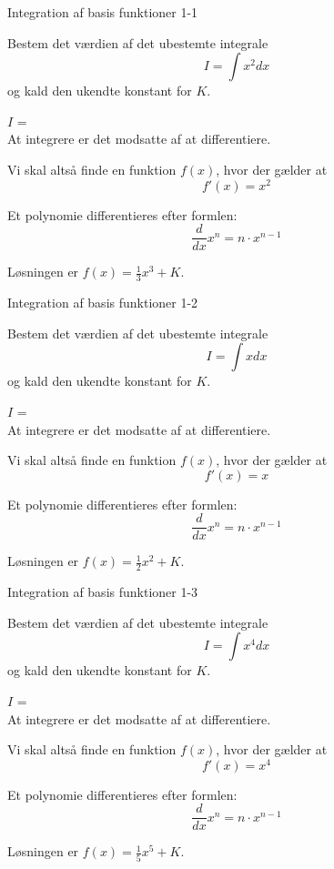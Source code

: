 \documentclass{article}
\begin{document}
\tableofcontents

\begin{exercise}{Integration af basis funktioner 1-1}

Bestem det værdien af det ubestemte integrale
\[
I = \int x^2 dx
\]
og kald den ukendte konstant for $K$.

$I$ =  \\

\hint
At integrere er det modsatte af at differentiere.

\hint
Vi skal altså finde en funktion $f(x)$, hvor der gælder at
\[
f'(x) = x^2
\]

\hint
Et polynomie differentieres efter formlen:
\[
\frac{d}{dx} x^n = n \cdot x^{n - 1}
\]

\hint
Løsningen er $f(x) = \frac{1}{3} x^3 + K$.

\end{exercise}


\begin{exercise}{Integration af basis funktioner 1-2}

Bestem det værdien af det ubestemte integrale
\[
I = \int x dx
\]
og kald den ukendte konstant for $K$.

$I$ =  \\

\hint
At integrere er det modsatte af at differentiere.

\hint
Vi skal altså finde en funktion $f(x)$, hvor der gælder at
\[
f'(x) = x
\]

\hint
Et polynomie differentieres efter formlen:
\[
\frac{d}{dx} x^n = n \cdot x^{n - 1}
\]

\hint
Løsningen er $f(x) = \frac{1}{2} x^2 + K$.

\end{exercise}


\begin{exercise}{Integration af basis funktioner 1-3}

Bestem det værdien af det ubestemte integrale
\[
I = \int x^4 dx
\]
og kald den ukendte konstant for $K$.

$I$ =  \\

\hint
At integrere er det modsatte af at differentiere.

\hint
Vi skal altså finde en funktion $f(x)$, hvor der gælder at
\[
f'(x) = x^4
\]

\hint
Et polynomie differentieres efter formlen:
\[
\frac{d}{dx} x^n = n \cdot x^{n - 1}
\]

\hint
Løsningen er $f(x) = \frac{1}{5} x^5 + K$.

\end{exercise}
\end{document}
